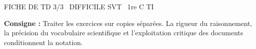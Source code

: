 \documentclass[11pt]{article}
\begin{document}
\begin{tcolorbox}[enhanced,colback=popink,colframe=popink,arc=10pt,boxrule=0pt,left=12pt,right=12pt,top=9pt,bottom=9pt]
{\color{white}\popxbold\small FICHE DE TD 3/3 \textbullet\ DIFFICILE \hfill SVT \textbullet\ 1re C TI\par}
\end{tcolorbox}
\vspace{4pt}
\noindent \textbf{Consigne :} Traiter les exercices sur copies séparées. La rigueur du raisonnement, la précision du vocabulaire scientifique et l'exploitation critique des documents conditionnent la notation.
\end{document}
